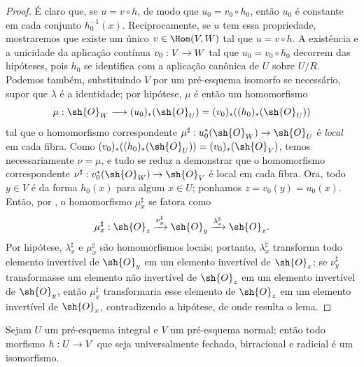 \documentclass[oneside,10pt]{amsart}
\makeatletter
\newcommand{\ega@arrow}[2]{\mathchoice{#1}{#2}{#2}{#2}}
\renewcommand{\to}{\ega@arrow{\longrightarrow}{\rightarrow}}
\let\EGAOriginalLabel\label
\renewcommand{\label}[1]{\phantomsection\EGAOriginalLabel{#1}}
\makeatother
\begin{document}
\begin{proof}
É claro que, se $u=v\circ h$, de modo que $u_0=v_0\circ h_0$, então $u_0$ é constante em cada conjunto $h_0^{-1}(x)$.
Reciprocamente, se $u$ tem essa propriedade, mostraremos que existe um único $v\in\Hom(V,W)$ tal que $u=v\circ h$.
A existência e a unicidade da aplicação contínua $v_0:V\to W$ tal que $u_0=v_0\circ h_0$ decorrem das hipóteses, pois $h_0$ se identifica com a aplicação canônica de $U$ sobre $U/R$.
Podemos também, substituindo $V$ por um pré-esquema isomorfo se necessário, supor que $\lambda$ é a identidade;
por hipótese, $\mu$ é então um homomorfismo
\[
    \mu:\sh{O}_W\longrightarrow(u_0)_*(\sh{O}_U)
    =(v_0)_*((h_0)_*(\sh{O}_U))
\]
tal que o homomorfismo correspondente $\mu^\sharp:u_0^*(\sh{O}_W)\to\sh{O}_U$ é \emph{local} em cada fibra.
Como $(v_0)_*((h_0)_*(\sh{O}_U))=(v_0)_*(\sh{O}_V)$, temos necessariamente $\nu=\mu$, e tudo se reduz a demonstrar que o homomorfismo correspondente $\nu^\sharp:v_0^*(\sh{O}_W)\to\sh{O}_V$ é local em cada fibra.
Ora, todo $y\in V$ é da forma $h_0(x)$ para algum $x\in U$;
ponhamos $z=v_0(y)=u_0(x)$.
Então, por , o homomorfismo $\mu_x^\sharp$ se fatora como
\[
    \mu_x^\sharp:\sh{O}_z
    \xrightarrow{\nu_y^\sharp}\sh{O}_y
    \xrightarrow{\lambda_x^\sharp}\sh{O}_x.
\]
Por hipótese, $\lambda_x^\sharp$ e $\mu_x^\sharp$ são homomorfismos locais;
portanto, $\lambda_x^\sharp$ transforma todo elemento invertível de $\sh{O}_y$ em um elemento invertível de $\sh{O}_x$;
se $\nu_y^\sharp$ transformasse um elemento não invertível de $\sh{O}_z$ em um elemento invertível de $\sh{O}_y$, então $\mu_x^\sharp$ transformaria esse elemento de $\sh{O}_z$ em um elemento invertível de $\sh{O}_x$, contradizendo a hipótese, de onde resulta o lema.
\end{proof}

\begin{corollary}[8.11.2]
\label{II.8.11.2}
Sejam $U$ um pré-esquema integral e $V$ um pré-esquema normal;
então todo morfismo $h:U\to V$ que seja universalmente fechado, birracional e radicial é um isomorfismo.
\end{corollary}
\end{document}
